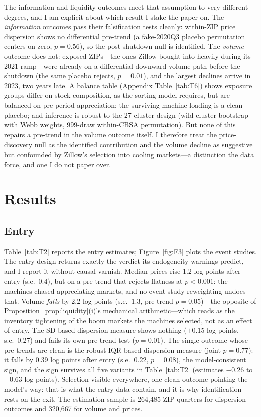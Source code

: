 \documentclass[12pt, letterpaper]{article}
\theoremstyle{remark}
\begin{document}
The information and liquidity outcomes meet that assumption to very different degrees, and I am explicit about which result I stake the paper on. The \emph{information} outcomes pass their falsification tests cleanly: within-ZIP price dispersion shows no differential pre-trend (a fake-2020Q3 placebo permutation centers on zero, $p = 0.56$), so the post-shutdown null is identified. The \emph{volume} outcome does not: exposed ZIPs---the ones Zillow bought into heavily during its 2021 ramp---were already on a differential downward volume path before the shutdown (the same placebo rejects, $p = 0.01$), and the largest declines arrive in 2023, two years late. A balance table (Appendix Table~\ref{tab:T6}) shows exposure groups differ on stock composition, as the sorting model requires, but are balanced on pre-period appreciation; the surviving-machine loading is a clean placebo; and inference is robust to the 27-cluster design (wild cluster bootstrap with Webb weights, 999-draw within-CBSA permutation). But none of this repairs a pre-trend in the volume outcome itself. I therefore treat the price-discovery null as the identified contribution and the volume decline as suggestive but confounded by Zillow's selection into cooling markets---a distinction the data force, and one I do not paper over.

\section{Results}\label{sec:results}

\subsection{Entry}\label{sec:results-entry}

Table~\ref{tab:T2} reports the entry estimates; Figure~\ref{fig:F3} plots the event studies. The entry design returns exactly the verdict its endogeneity warnings predict, and I report it without causal varnish. Median prices rise 1.2 log points after entry (s.e.\ 0.4), but on a pre-trend that rejects flatness at $p < 0.001$: the machines chased appreciating markets, and no event-study reweighting undoes that. Volume \emph{falls} by 2.2 log points (s.e.\ 1.3, pre-trend $p = 0.05$)---the opposite of Proposition~\ref{prop:liquidity}(i)'s mechanical arithmetic---which reads as the inventory tightening of the boom markets the machines selected, not as an effect of entry. The SD-based dispersion measure shows nothing ($+0.15$ log points, s.e.\ 0.27) and fails its own pre-trend test ($p = 0.01$). The single outcome whose pre-trends are clean is the robust IQR-based dispersion measure (joint $p = 0.77$): it falls by 0.39 log points after entry (s.e.\ 0.22, $p = 0.08$), the model-consistent sign, and the sign survives all five variants in Table~\ref{tab:T2} (estimates $-0.26$ to $-0.63$ log points). Selection visible everywhere, one clean outcome pointing the model's way: that is what the entry data contain, and it is why identification rests on the exit. The estimation sample is 264{,}485 ZIP-quarters for dispersion outcomes and 320{,}667 for volume and prices.
\end{document}
